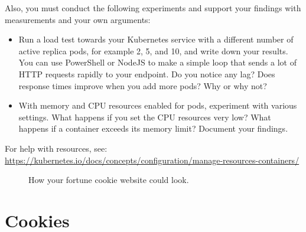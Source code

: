 \documentclass[titlepage,a4paper,10pt]{article}
\begin{document}
Also, you must conduct the following experiments and support your findings with measurements and your own arguments:

\begin{itemize}
	\item Run a load test towards your Kubernetes service with a different number of active replica pods, for example 2, 5, and 10, and write down your results. You can use PowerShell or NodeJS to make a simple loop that sends a lot of HTTP requests rapidly to your endpoint. Do you notice any lag? Does response times improve when you add more pods? Why or why not?
	\item With memory and CPU resources enabled for pods, experiment with various settings. What happens if you set the CPU resources very low? What happens if a container exceeds its memory limit? Document your findings.
\end{itemize}

For help with resources, see: \\ \url{https://kubernetes.io/docs/concepts/configuration/manage-resources-containers/}

\begin{figure}[H]
	\centering
	\caption{How your fortune cookie website could look.}
	\label{fig:fortunecookie}
\end{figure}

\pagebreak

\appendix
\section{Cookies}
\end{document}

